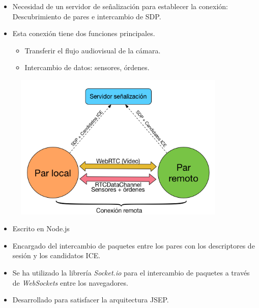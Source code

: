 \documentclass[notes,slidesec,a4]{seminar}
\begin{document}

\begin{hslide}
\begin{minipage}[t]{0.6\textwidth}
\begin{itemize}
\item Necesidad de un servidor de señalización para establecer la conexión: Descubrimiento de pares e intercambio de SDP.
\item Esta conexión tiene dos funciones principales.
\begin{itemize}
\item Transferir el flujo audiovisual de la cámara.
\item Intercambio de datos: sensores, órdenes.
\end{itemize}
\end{itemize}

\end{minipage}
\begin{minipage}[t]{0.6\textwidth}
\begin{center}
\begin{figure}
\includegraphics[width=0.9\textwidth]{img/conexionremota}
\end{figure}
\end{center}
\end{minipage}

\end{hslide}



\begin{hslide}
\begin{itemize}
\item Escrito en Node.js
\item Encargado del intercambio de paquetes entre los pares con los descriptores de sesión y los candidatos ICE.
\item Se ha utilizado la librería \emph{Socket.io} para el intercambio de paquetes a través de \emph{WebSockets} entre los navegadores.
\item Desarrollado para satisfacer la arquitectura JSEP.
\end{itemize}
\end{hslide}
\end{document}
